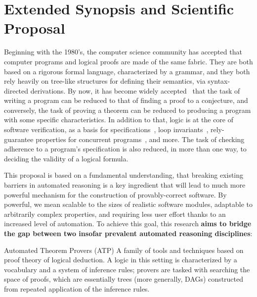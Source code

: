 
\section{Extended Synopsis and Scientific Proposal}


Beginning with the 1980's, the computer science community has accepted
that computer programs and logical proofs are made of the same fabric.
They are both based on a rigorous formal language, characterized by a grammar,
and they both rely heavily on tree-like structures for defining their semantics,
via syntax-directed derivations.
By now, it has become widely accepted~\cite{PNAS1934:Curry,Essay1969:Howard,IC1988:Coquand,CACM2015:Wadler} that the task of writing a program can be
reduced to that of finding a proof to a conjecture, and conversely, the task of
proving a theorem can be reduced to producing a program with some specific
characteristics.
In addition to that, logic is at the core of software verification, as a basis
for specifications~\cite{LPAR2010:Leino,ECOOP2013:Regis,ICSE2009:Schulte,PASTE2005:Barnett,CAV2015:Gurfinkel}, loop invariants~\cite{VMCAI2011:Bradley,CAV2013:Komuravelli,CAV2019:Feldman}, rely-guarantee properties for concurrent programs~\cite{relyguarantee1,TCS2007:Jones}, and more.
The task of checking adherence to a program's specification is also reduced, in
more than one way, to deciding the validity of a logical formula.

\medskip
This proposal is based on a fundamental understanding, that breaking existing
barriers in automated reasoning is a key ingredient that will lead to
much more powerful mechanism for the construction of provably-correct software.
By powerful, we mean scalable to the sizes of realistic software modules,
adaptable to arbitrarily complex properties,
and requiring less user effort thanks to an increased level of automation.
To achieve this goal, this research \textbf{aims to bridge the gap between two insofar prevalent automated  reasoning disciplines}:

\begin{paragraph}{Automated Theorem Provers (ATP)} A family of tools and techniques based on proof
theory of logical deduction.
A logic in this setting is characterized by a vocabulary and a system of
inference rules; provers are tasked with searching the space of proofs, which
are essentially trees (more generally, DAGs) constructed from repeated
application of the inference rules.
\end{paragraph}

